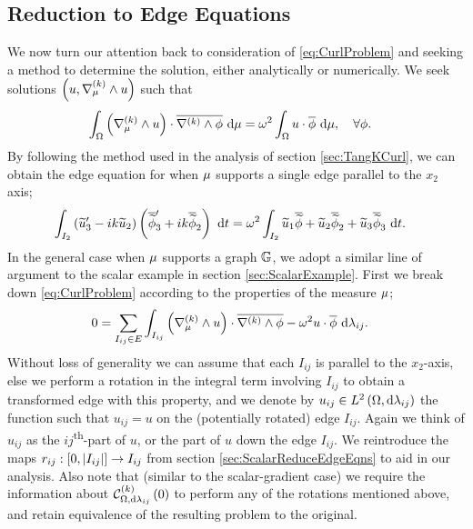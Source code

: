\subsection{Reduction to Edge Equations}
We now turn our attention back to consideration of \eqref{eq:CurlProblem}  and seeking a method to determine the solution, either analytically or numerically.
We seek solutions $\left( u,\nabla_{\mu}^{(k)}\wedge u \right)$ such that
\begin{align*}
	\int_{\Omega}\left( \nabla_{\mu}^{(k)}\wedge u \right)\cdot\overline{\nabla^{(k)}\wedge\phi} \ \mathrm{d}\mu &= \omega^2\int_{\Omega}u\cdot\overline{\phi} \ \mathrm{d}\mu, \quad \forall\phi .
\end{align*}
By following the method used in the analysis of section \ref{sec:TangKCurl}, we can obtain the edge equation for when $\mu$ supports a single edge parallel to the $x_2$ axis;
\begin{align} \label{eq:OneEdge-EdgeEqn}
	\int_{I_2}\left( \widetilde{u}_3^{\prime}-ik\widetilde{u}_2 \right)\left( \overline{\widetilde{\phi}}_3^{\prime}+ik\overline{\widetilde{\phi}}_2 \right) \ \mathrm{d}t &= \omega^2\int_{I_2}\widetilde{u}_1\overline{\widetilde{\phi}} + \widetilde{u}_2\overline{\widetilde{\phi}}_2 + \widetilde{u}_3\overline{\widetilde{\phi}}_3 \ \mathrm{d}t.
\end{align}
In the general case when $\mu$ supports a graph $\mathbb{G}$, we adopt a similar line of argument to the scalar example in section \ref{sec:ScalarExample}.
First we break down \eqref{eq:CurlProblem} according to the properties of the measure $\mu$;
\begin{align*}
	0 &= \sum_{I_{ij}\in E} \int_{I_{ij}}\left( \nabla_{\mu}^{(k)}\wedge u \right)\cdot\overline{\nabla_{}^{(k)}\wedge\phi}-\omega^2 u\cdot\overline{\phi} \ \mathrm{d}\lambda_{ij}.
\end{align*}
Without loss of generality we can assume that each $I_{ij}$ is parallel to the $x_2$-axis, else we perform a rotation in the integral term involving $I_{ij}$ to obtain a transformed edge with this property, and we denote by $u_{ij}\in L^{2}\left( \Omega,\mathrm{d}\lambda_{ij} \right)$ the function such that $u_{ij}=u$ on the (potentially rotated) edge $I_{ij}$.
Again we think of $u_{ij}$ as the $ij$\textsuperscript{th}-part of $u$, or the part of $u$ down the edge $I_{ij}$.
We reintroduce the maps $r_{ij}:\left[ 0,\lvert I_{ij} \rvert \right]\rightarrow I_{ij}$ from section \ref{sec:ScalarReduceEdgeEqns} to aid in our analysis.
Also note that (similar to the scalar-gradient case) we require the information about $\mathcal{C}_{ \Omega, \mathrm{d}\lambda_{ij}}^{(k)}\left( 0 \right)$ to perform any of the rotations mentioned above, and retain equivalence of the resulting problem to the original.\newline

